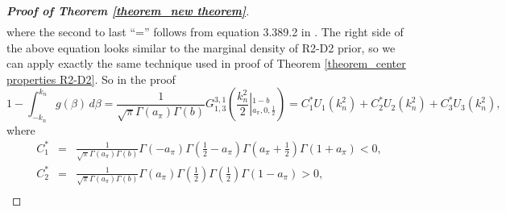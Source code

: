 \documentclass[12pt]{article}
\begin{document}
\begin{proof} [\textbf{Proof of Theorem \ref{theorem_new theorem}}]
\begin{eqnarray*}
	\end{eqnarray*}
	where the    second to last  ``='' follows from equation 3.389.2 in \cite{zwillinger2014table}.
	The right side of the above equation looks similar to the marginal density of R2-D2 prior,  so  we can apply exactly the same technique used  in proof of Theorem  \ref{theorem_center properties R2-D2}. So   in the proof
	\[1 - \int_{-k_n}^{k_n} g(\beta)\, d\beta  =
	\frac{1}{\sqrt{\pi}\Gamma(a_{\pi})\Gamma(b)}   G_{1,3}^{3,1}\left(\frac{k_n^2}{2}
	\left\vert ^{1-b}_{a_{\pi}, 0, \frac{1}{2}} \right. \right)
	= C_1^\ast U_1(k_n^2) + C_2^\ast U_2(k_n^2) + C_3^\ast U_3(k_n^2),
	\]
	where
	\begin{eqnarray*}
		C_1 ^\ast  &=& \frac{1}{\sqrt{\pi}\Gamma(a_{\pi})\Gamma(b)}   \Gamma(-a_{\pi})\Gamma(\frac{1}{2}-a_{\pi})\Gamma(a_{\pi} + \frac{1}{2}) \Gamma(1+a_{\pi})  <0 , \\
		C_2^\ast  &=& \frac{1}{\sqrt{\pi}\Gamma(a_{\pi})\Gamma(b)}  \Gamma(a_{\pi} ) \Gamma(\frac{1}{2})\Gamma(\frac{1}{2}) \Gamma(1-a_{\pi}) >0  , \\

\end{eqnarray*}
\end{proof}
\end{document}
